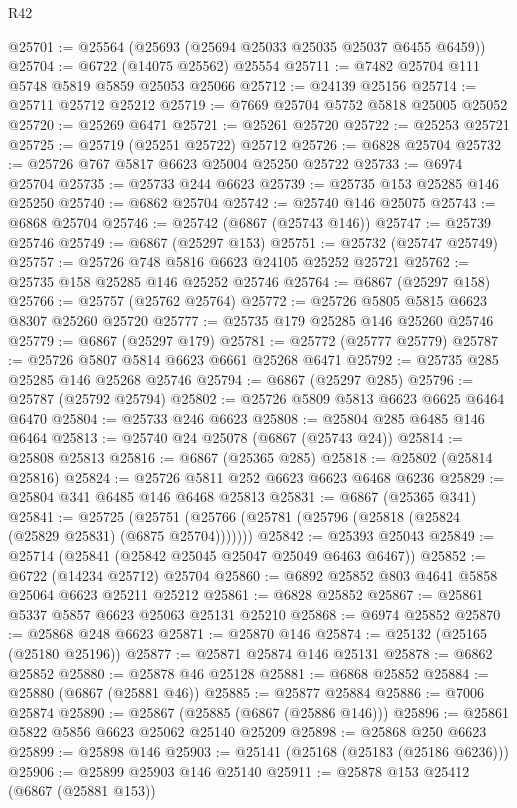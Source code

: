 \begin{lexlean}{R42}
\begin{coremodule}
{@25701 := @25564 (@25693 (@25694 @25033 @25035 @25037 @6455 @6459))
@25704 := @6722 (@14075 @25562) @25554
@25711 := @7482 @25704 @111 @5748 @5819 @5859 @25053 @25066
@25712 := @24139 @25156
@25714 := @25711 @25712 @25212
@25719 := @7669 @25704 @5752 @5818 @25005 @25052
@25720 := @25269 @6471
@25721 := @25261 @25720
@25722 := @25253 @25721
@25725 := @25719 (@25251 @25722) @25712
@25726 := @6828 @25704
@25732 := @25726 @767 @5817 @6623 @25004 @25250 @25722
@25733 := @6974 @25704
@25735 := @25733 @244 @6623
@25739 := @25735 @153 @25285 @146 @25250
@25740 := @6862 @25704
@25742 := @25740 @146 @25075
@25743 := @6868 @25704
@25746 := @25742 (@6867 (@25743 @146))
@25747 := @25739 @25746
@25749 := @6867 (@25297 @153)
@25751 := @25732 (@25747 @25749)
@25757 := @25726 @748 @5816 @6623 @24105 @25252 @25721
@25762 := @25735 @158 @25285 @146 @25252 @25746
@25764 := @6867 (@25297 @158)
@25766 := @25757 (@25762 @25764)
@25772 := @25726 @5805 @5815 @6623 @8307 @25260 @25720
@25777 := @25735 @179 @25285 @146 @25260 @25746
@25779 := @6867 (@25297 @179)
@25781 := @25772 (@25777 @25779)
@25787 := @25726 @5807 @5814 @6623 @6661 @25268 @6471
@25792 := @25735 @285 @25285 @146 @25268 @25746
@25794 := @6867 (@25297 @285)
@25796 := @25787 (@25792 @25794)
@25802 := @25726 @5809 @5813 @6623 @6625 @6464 @6470
@25804 := @25733 @246 @6623
@25808 := @25804 @285 @6485 @146 @6464
@25813 := @25740 @24 @25078 (@6867 (@25743 @24))
@25814 := @25808 @25813
@25816 := @6867 (@25365 @285)
@25818 := @25802 (@25814 @25816)
@25824 := @25726 @5811 @252 @6623 @6623 @6468 @6236
@25829 := @25804 @341 @6485 @146 @6468 @25813
@25831 := @6867 (@25365 @341)
@25841 := @25725
    (@25751 (@25766 (@25781 (@25796 (@25818 (@25824 (@25829 @25831) (@6875 @25704)))))))
@25842 := @25393 @25043
@25849 := @25714 (@25841 (@25842 @25045 @25047 @25049 @6463 @6467))
@25852 := @6722 (@14234 @25712) @25704
@25860 := @6892 @25852 @803 @4641 @5858 @25064 @6623 @25211 @25212
@25861 := @6828 @25852
@25867 := @25861 @5337 @5857 @6623 @25063 @25131 @25210
@25868 := @6974 @25852
@25870 := @25868 @248 @6623
@25871 := @25870 @146
@25874 := @25132 (@25165 (@25180 @25196))
@25877 := @25871 @25874 @146 @25131
@25878 := @6862 @25852
@25880 := @25878 @46 @25128
@25881 := @6868 @25852
@25884 := @25880 (@6867 (@25881 @46))
@25885 := @25877 @25884
@25886 := @7006 @25874
@25890 := @25867 (@25885 (@6867 (@25886 @146)))
@25896 := @25861 @5822 @5856 @6623 @25062 @25140 @25209
@25898 := @25868 @250 @6623
@25899 := @25898 @146
@25903 := @25141 (@25168 (@25183 (@25186 @6236)))
@25906 := @25899 @25903 @146 @25140
@25911 := @25878 @153 @25412 (@6867 (@25881 @153))
}
\end{coremodule}
\end{lexlean}
